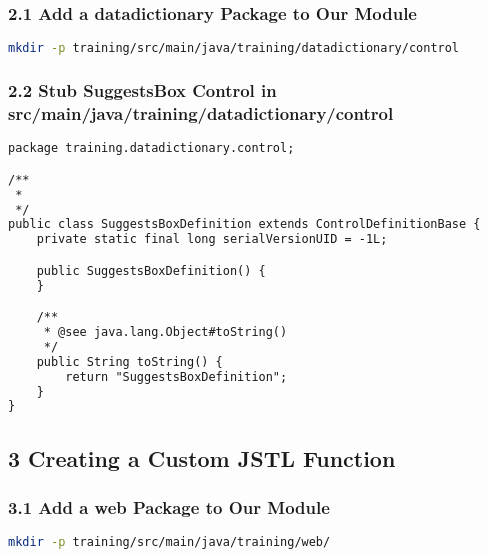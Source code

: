 \subsubsection*{2.1 Add a datadictionary Package to Our Module}

\begin{lstlisting}[language=bash,backgroundcolor=\color{ubergray},caption={Directory creation for Linux
    users},frame=single,breaklines=true]
  mkdir -p training/src/main/java/training/datadictionary/control
\end{lstlisting}

\subsubsection*{2.2 Stub SuggestsBox Control in src/main/java/training/datadictionary/control}
\begin{lstlisting}[language=xml,backgroundcolor=\color{ubergray},caption={Stubbed
  OJB Descriptor file src/main/resources/OJB-repository-training.xml},frame=single,breaklines=true]
package training.datadictionary.control;

/**
 *
 */
public class SuggestsBoxDefinition extends ControlDefinitionBase {
    private static final long serialVersionUID = -1L;

	public SuggestsBoxDefinition() {
    }

    /**
     * @see java.lang.Object#toString()
     */
    public String toString() {
        return "SuggestsBoxDefinition";
    }
}
\end{lstlisting}

\subsection*{3 Creating a Custom JSTL Function}
\subsubsection*{3.1 Add a web Package to Our Module}

\begin{lstlisting}[language=bash,backgroundcolor=\color{ubergray},caption={Directory creation for Linux
    users},frame=single,breaklines=true]
  mkdir -p training/src/main/java/training/web/
\end{lstlisting}




